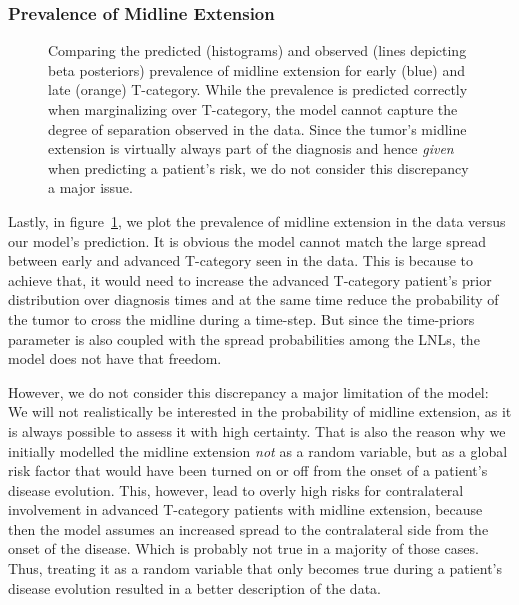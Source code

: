 \documentclass[
  sn-mathphys-num,
]{sn-jnl}
\begin{document}
\subsubsection{Prevalence of Midline
Extension}\label{prevalence-of-midline-extension}

\begin{figure}


\caption{\label{fig-model-prevalences-midext}Comparing the predicted
(histograms) and observed (lines depicting beta posteriors) prevalence
of midline extension for early (blue) and late (orange) T-category.
While the prevalence is predicted correctly when marginalizing over
T-category, the model cannot capture the degree of separation observed
in the data. Since the tumor's midline extension is virtually always
part of the diagnosis and hence \emph{given} when predicting a patient's
risk, we do not consider this discrepancy a major issue.}

\end{figure}%

Lastly, in figure~\ref{fig-model-prevalences-midext}, we plot the
prevalence of midline extension in the data versus our model's
prediction. It is obvious the model cannot match the large spread
between early and advanced T-category seen in the data. This is because
to achieve that, it would need to increase the advanced T-category
patient's prior distribution over diagnosis times and at the same time
reduce the probability of the tumor to cross the midline during a
time-step. But since the time-priors parameter is also coupled with the
spread probabilities among the LNLs, the model does not have that
freedom.

However, we do not consider this discrepancy a major limitation of the
model: We will not realistically be interested in the probability of
midline extension, as it is always possible to assess it with high
certainty. That is also the reason why we initially modelled the midline
extension \emph{not} as a random variable, but as a global risk factor
that would have been turned on or off from the onset of a patient's
disease evolution. This, however, lead to overly high risks for
contralateral involvement in advanced T-category patients with midline
extension, because then the model assumes an increased spread to the
contralateral side from the onset of the disease. Which is probably not
true in a majority of those cases. Thus, treating it as a random
variable that only becomes true during a patient's disease evolution
resulted in a better description of the data.
\end{document}
